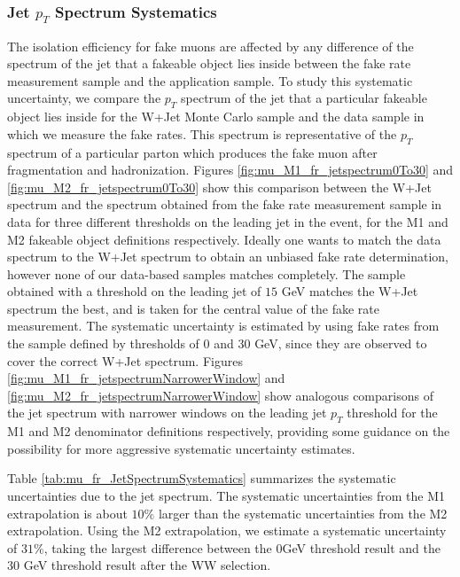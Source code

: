 \subsubsection{Jet $p_{T}$ Spectrum Systematics}
\label{sec:FakeMuonBkgJetSpectrumSystematics}

The isolation efficiency for fake muons are affected by any difference of the spectrum of the
jet that a fakeable object lies inside between the fake rate measurement sample and the 
application sample. To study this systematic uncertainty, we compare the $p_{T}$ spectrum 
of the jet that a particular fakeable object lies inside for the W+Jet Monte Carlo sample and the
data sample in which we measure the fake rates. This spectrum is representative of the $p_{T}$
spectrum of a particular parton which produces the fake muon after fragmentation and 
hadronization. Figures \ref{fig:mu_M1_fr_jetspectrum0To30} and \ref{fig:mu_M2_fr_jetspectrum0To30} show 
this comparison between the W+Jet spectrum and the spectrum obtained from the fake rate measurement 
sample in data for three different thresholds on the leading jet in the event, for the M1 and M2
fakeable object definitions respectively. Ideally one wants to match the data spectrum to the
W+Jet spectrum to obtain an unbiased fake rate determination, however none of our data-based
samples matches completely. The sample obtained with a threshold on the leading jet of
$15$ GeV matches the W+Jet spectrum the best, and is taken for the central value of the 
fake rate measurement. The systematic uncertainty is estimated by using fake rates from the sample 
defined by thresholds of $0$ and $30$ GeV, since they are observed to cover the 
correct W+Jet spectrum. Figures \ref{fig:mu_M1_fr_jetspectrumNarrowerWindow} and 
\ref{fig:mu_M2_fr_jetspectrumNarrowerWindow} show analogous 
comparisons of the jet spectrum with narrower windows on the leading jet $p_{T}$ threshold 
for the M1 and M2 denominator definitions respectively, providing some guidance on the 
possibility for more aggressive systematic uncertainty estimates.

Table \ref{tab:mu_fr_JetSpectrumSystematics} summarizes the systematic
uncertainties due to the jet spectrum. The systematic uncertainties from the M1 extrapolation
is about $10\%$ larger than the systematic uncertainties from the M2 extrapolation. 
Using the M2 extrapolation, we estimate a systematic uncertainty of $31\%$, taking the largest 
difference between the $0$GeV threshold result and the $30$ GeV threshold result after the 
WW selection.

